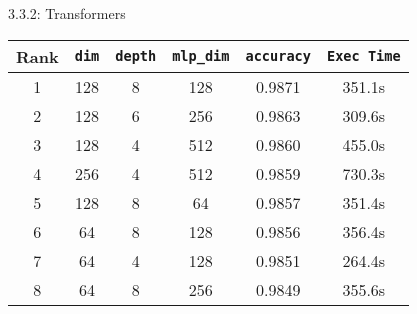 \begin{task}{3.3.2: Transformers}
\end{task}

\begin{table}[htbp]
  \begin{center}
    \begin{tabular}{|c|c|c|c|c|c|}
      \hline
      \textbf{Rank} & \textbf{\texttt{dim}} & \textbf{\texttt{depth}} & \textbf{\texttt{mlp\_dim}} & \textbf{\texttt{accuracy}} & \textbf{\texttt{Exec Time}} \\
      \hline
      1             & 128                   & 8                       & 128                        & 0.9871                     & 351.1s                      \\
      \hline
      2             & 128                   & 6                       & 256                        & 0.9863                     & 309.6s                      \\
      \hline
      3             & 128                   & 4                       & 512                        & 0.9860                     & 455.0s                      \\
      \hline
      4             & 256                   & 4                       & 512                        & 0.9859                     & 730.3s                      \\
      \hline
      5             & 128                   & 8                       & 64                         & 0.9857                     & 351.4s                      \\
      \hline
      6             & 64                    & 8                       & 128                        & 0.9856                     & 356.4s                      \\
      \hline
      7             & 64                    & 4                       & 128                        & 0.9851                     & 264.4s                      \\
      \hline
      8             & 64                    & 8                       & 256                        & 0.9849                     & 355.6s                      \\

\end{tabular}
\end{center}
\end{table}
